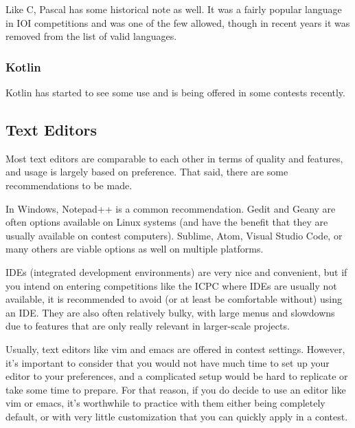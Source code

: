 Like C, Pascal has some historical note as well. It was a fairly popular language in IOI competitions and was one of the few allowed, though in recent years it was removed from the list of valid languages.

\subsubsection{Kotlin}

Kotlin has started to see some use and is being offered in some contests recently.

\subsection{Text Editors}

Most text editors are comparable to each other in terms of quality and features, and usage is largely based on preference. That said, there are some recommendations to be made.

In Windows, Notepad++ is a common recommendation. Gedit and Geany are often options available on Linux systems (and have the benefit that they are usually available on contest computers). Sublime, Atom, Visual Studio Code, or many others are viable options as well on multiple platforms.

IDEs (integrated development environments) are very nice and convenient, but if you intend on entering competitions like the ICPC where IDEs are usually not available, it is recommended to avoid (or at least be comfortable without) using an IDE. They are also often relatively bulky, with large menus and slowdowns due to features that are only really relevant in larger-scale projects.

Usually, text editors like vim and emacs are offered in contest settings. However, it's important to consider that you would not have much time to set up your editor to your preferences, and a complicated setup would be hard to replicate or take some time to prepare. For that reason, if you do decide to use an editor like vim or emacs, it's worthwhile to practice with them either being completely default, or with very little customization that you can quickly apply in a contest.